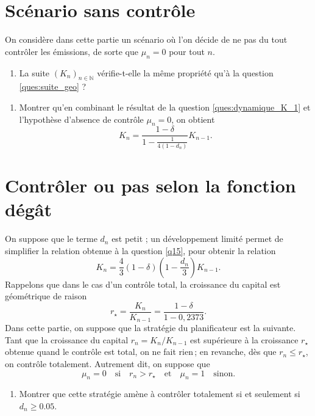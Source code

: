 \documentclass[12pt]{article}
\newcommand{\ques}[1]{\begin{enumerate}[resume]
\item  #1
\end{enumerate}}
\newcommand{\rep}[1]{\textit{Réponse :} #1 \\}
\renewcommand{\rep}[1]{ }
\theoremstyle{remark}
\def\NN{\mathbb{N}}
\begin{document}
\section{Scénario sans contrôle}
On considère dans cette partie un scénario où l'on décide de ne pas du tout contrôler les émissions, de sorte que $\mu_n=0$ pour tout $n$.
\ques{La suite $(K_n)_{n\in \NN}$ vérifie-t-elle la même propriété qu'à la question \ref{ques:suite_geo} ?}
\rep{Non, dans ce cas la suite $(T_n)_{n\in \NN}$, et donc la suite $(\Omega_n)_{n\in \NN}$, n'est pas constante et dépend de $(K_n)_{n\in \NN}$. La suite $(K_n)_{n\in \NN}$ n'est donc pas géométrique.}


\ques{\label{q15}Montrer qu'en combinant le résultat de la question \ref{ques:dynamique_K_1} et l'hypothèse d'absence de contrôle $\mu_n =0$, on obtient
\begin{equation*} 
K_n=\frac{1- \delta}{1- \frac{1}{4(1-d_n)}} K_{n-1}.\end{equation*}
\label{ques:dynamique_K_3}
}

\section{Contrôler ou pas selon la fonction dégât}

On suppose que le terme $d_n$ est petit ; un développement limité permet de simplifier la relation obtenue à la question \ref{q15}, pour obtenir la relation
\begin{equation*} 
K_n=\frac{4}{3}(1- \delta)\left(1-\frac{d_n}{3}\right) K_{n-1}.
\end{equation*}
Rappelons que dans le cas d'un contrôle total, la croissance du capital est géométrique de raison 
$$
r_\star = \frac{K_n}{K_{n-1}} = \frac{1- \delta}{1- 0,2373}.
$$
Dans cette partie, on suppose que la stratégie du planificateur est la suivante. Tant que la croissance du capital $r_n = K_n / K_{n-1}$ est supérieure à la croissance $r_\star$ obtenue quand le contrôle est total, on ne fait rien$\,$; en revanche, dès que $r_n \leq r_\star$, on contrôle totalement. Autrement dit, on suppose que
$$
 \mu_n = 0 \quad \text{si} \quad r_n > r_\star \quad \text{et} \quad \mu_n = 1 \quad \text{sinon.}
$$

\ques{Montrer que cette stratégie amène à contrôler totalement si et seulement si $d_n \geq 0.05.$}
\rep{On choisit de contrôler les émissions lorsque le facteur multiplicatif du scénario contrôlé est supérieur au scénario non contrôlé :
\begin{equation*}
\begin{aligned}
&(1-\delta)\frac{4}{3}\left(1-\frac{d_n}{3}\right) < \frac{1-\delta}{1-0,2373} \\
\text{ssi} \quad &1-\frac{d_n}{3} < \frac{3}{4}\times \frac{1}{0,7627} \\
\text{ssi} \quad &0,05 = 3-\frac{9}{4 \times 0,7627} < d_n
\end{aligned}
\end{equation*}
}
\end{document}
